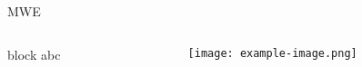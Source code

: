 \documentclass{beamer}
\begin{document}
\begin{frame}{MWE}
\begin{columns}[T]

\begin{column}{.5\textwidth}
\begin{block}{block}
    abc
\end{block}
\end{column}

\begin{column}{.5\textwidth}
\texttt{[image: example-image.png]}
\end{column}

\end{columns}
\end{frame}
\end{document}
